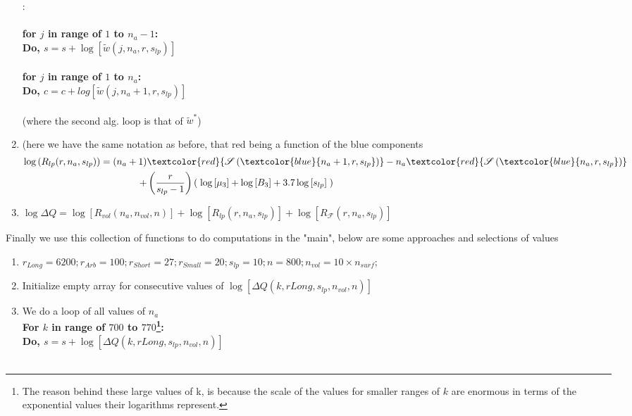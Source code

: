\documentclass[12pt,letterpaper]{article}
\newcommand{\lr}[1]{\left( #1 \right)}
\newcommand{\lrb}[1]{\left[ #1 \right]}
\newcommand{\fop}{\ensuremath{\mathcal{F}}}
\newcommand{\schw}{\ensuremath{\mathscr{S}}}
\begin{document}
\begin{steps}
\begin{enumerate}
{    }:\\\\
    \textbf{
    for $j$ in range of $1$ to $n_a-1$:\\
    Do, $s=s+\log[\tilde{w}(j,n_a,r,s_{lp})]$\\\\
    for $j$ in range of $1$ to $n_a$:\\
    Do, $c=c+log[\tilde{w}(j,n_a+1,r,s_{lp})]$\\
    }\\
    (where the second alg. loop is that of $\tilde{w}^*$)\\
    \item (here we have the same notation as before, that red being a function of the blue components 
    \begin{align*}
    \log
    \lr{
    R_{lp}(r,n_a,s_{lp})
    }
    =
    \lr{
    n_a+1
    }
    &
    \textcolor{red}{
        \schw
        \lr{
            \textcolor{blue}{
                n_a+1,r,s_{lp}
            }
        }
    }
    -
    n_a
    \textcolor{red}{
        \schw
        \lr{
            \textcolor{blue}{
            n_a,r,s_{lp}
            }
        }
    }\\
    +
    &
    \lr{
        \frac{
        r
        }{
        s_{lp}-1
        }
    }
    \lr{\;
    \log
    \lrb{
    \mu_3
    }
    +
    \log
    \lrb{
        B_3
    }
    +
    3.7
    \log
    \lrb{
        s_{lp}
    }
    \;
    }
    \end{align*}
    \item
    $
    \log\Delta Q = \log
    \lrb{
    R_{vol}(n_a,n_{vol},n)
    }
    +
    \log
    \lrb{
    R_{lp}(r,n_a,s_{lp})
    }
    +
    \log
    \lrb{
    R_{\fop}(r,n_a,s_{lp})
    }
    $
  \end{enumerate}
  \item Finally we use this collection of functions to do computations in the "main", below are some approaches and selections of values
  \begin{enumerate}
      \item $r_{Long}=6200;r_{Arb}=100; r_{Short}=27; r_{Small}=20;s_{lp}=10; n=800;n_{vol}=10\times n_{surf};$
      \item Initialize empty array for consecutive values of $\log\lrb{\Delta Q(k,rLong,s_{lp},n_{vol},n)}$
      \item We do a loop of all values of $n_a$\\
      
    \textbf{
    For $k$ in range of $700$ to $770$\footnote{
    The reason behind these large values of k, is because the scale of the values for smaller ranges of $k$ are enormous in terms of the exponential values their logarithms represent.
    }:\\
    Do, $s=s+\log\lrb{\Delta Q(k,rLong,s_{lp},n_{vol},n)}$        
    }\\\\
    

\end{enumerate}
\end{steps}
\end{document}
